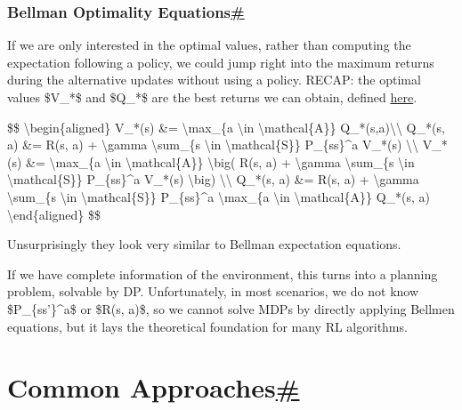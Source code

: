 \subsubsection{\texorpdfstring{Bellman Optimality Equations\hyperref[bellman-optimality-equations]{\#}}{Bellman Optimality Equations\#}}\label{bellman-optimality-equations}

If we are only interested in the optimal values, rather than computing the expectation following a policy, we could jump right into the maximum returns during the alternative updates without using a policy. RECAP: the optimal values \$V\_*\$ and \$Q\_*\$ are the best returns we can obtain, defined \hyperref[optimal-value-and-policy]{here}.

\$\$ \textbackslash begin\{aligned\} V\_*(s) \&= \textbackslash max\_\{a \textbackslash in \textbackslash mathcal\{A\}\} Q\_*(s,a)\textbackslash\textbackslash{} Q\_*(s, a) \&= R(s, a) + \textbackslash gamma \textbackslash sum\_\{s\textquotesingle{} \textbackslash in \textbackslash mathcal\{S\}\} P\_\{ss\textquotesingle\}\^{}a V\_*(s\textquotesingle) \textbackslash\textbackslash{} V\_*(s) \&= \textbackslash max\_\{a \textbackslash in \textbackslash mathcal\{A\}\} \textbackslash big( R(s, a) + \textbackslash gamma \textbackslash sum\_\{s\textquotesingle{} \textbackslash in \textbackslash mathcal\{S\}\} P\_\{ss\textquotesingle\}\^{}a V\_*(s\textquotesingle) \textbackslash big) \textbackslash\textbackslash{} Q\_*(s, a) \&= R(s, a) + \textbackslash gamma \textbackslash sum\_\{s\textquotesingle{} \textbackslash in \textbackslash mathcal\{S\}\} P\_\{ss\textquotesingle\}\^{}a \textbackslash max\_\{a\textquotesingle{} \textbackslash in \textbackslash mathcal\{A\}\} Q\_*(s\textquotesingle, a\textquotesingle) \textbackslash end\{aligned\} \$\$

Unsurprisingly they look very similar to Bellman expectation equations.

If we have complete information of the environment, this turns into a planning problem, solvable by DP. Unfortunately, in most scenarios, we do not know \$P\_\{ss'\}\^{}a\$ or \$R(s, a)\$, so we cannot solve MDPs by directly applying Bellmen equations, but it lays the theoretical foundation for many RL algorithms.

\section{\texorpdfstring{Common Approaches\hyperref[common-approaches]{\#}}{Common Approaches\#}}\label{common-approaches}

